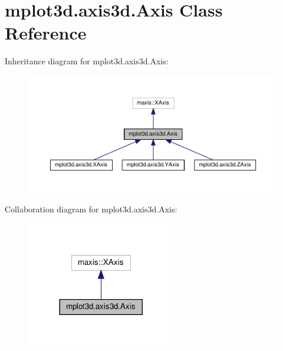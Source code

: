 \hypertarget{classmplot3d_1_1axis3d_1_1Axis}{}\section{mplot3d.\+axis3d.\+Axis Class Reference}
\label{classmplot3d_1_1axis3d_1_1Axis}


Inheritance diagram for mplot3d.\+axis3d.\+Axis\+:
\nopagebreak
\begin{figure}[H]
\begin{center}
\leavevmode
\includegraphics[width=350pt]{classmplot3d_1_1axis3d_1_1Axis__inherit__graph}
\end{center}
\end{figure}


Collaboration diagram for mplot3d.\+axis3d.\+Axis\+:
\nopagebreak
\begin{figure}[H]
\begin{center}
\leavevmode
\includegraphics[width=185pt]{classmplot3d_1_1axis3d_1_1Axis__coll__graph}
\end{center}
\end{figure}
